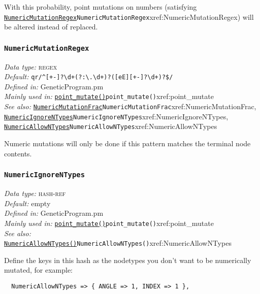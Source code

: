 \documentclass[a4paper]{article}
\begin{document}
With this probability, point mutations on numbers (satisfying
\hyperref[no]{\texttt{NumericMutationRegex}}{\texttt{NumericMutationRegex}}{xref:NumericMutationRegex}) will be altered instead of replaced.


\subsubsection{\texttt{NumericMutationRegex}}\label{xref:NumericMutationRegex}
\begin{flushleft}
\textit{Data type:} \textsc{regex}\\
\textit{Default:} \verb;qr/^[+-]?\d+(?:\.\d+)?([eE][+-]?\d+)?$/;\\ %
\textit{Defined in:} GeneticProgram.pm\\
\textit{Mainly used in:} \hyperref[no]{\texttt{point\_mutate()}}{\texttt{point\_mutate()}}{xref:point_mutate}\\
\textit{See also:} \hyperref[no]{\texttt{NumericMutationFrac}}{\texttt{NumericMutationFrac}}{xref:NumericMutationFrac}, \hyperref[no]{\texttt{NumericIgnoreNTypes}}{\texttt{NumericIgnoreNTypes}}{xref:NumericIgnoreNTypes}, \hyperref[no]{\texttt{NumericAllowNTypes}}{\texttt{NumericAllowNTypes}}{xref:NumericAllowNTypes}
\end{flushleft}

Numeric mutations will only be done if this pattern matches the
terminal node contents.

\subsubsection{\texttt{NumericIgnoreNTypes}}\label{xref:NumericIgnoreNTypes}
\begin{flushleft}
\textit{Data type:} \textsc{hash-ref}\\
\textit{Default:} empty\\
\textit{Defined in:} GeneticProgram.pm\\
\textit{Mainly used in:} \hyperref[no]{\texttt{point\_mutate()}}{\texttt{point\_mutate()}}{xref:point_mutate}\\
\textit{See also:} \hyperref[no]{\texttt{NumericAllowNTypes()}}{\texttt{NumericAllowNTypes()}}{xref:NumericAllowNTypes}
\end{flushleft}

Define the keys in this hash as the nodetypes you don't want to be
numerically mutated, for example:
\begin{verbatim}
  NumericAllowNTypes => { ANGLE => 1, INDEX => 1 },
\end{verbatim}
\end{document}
